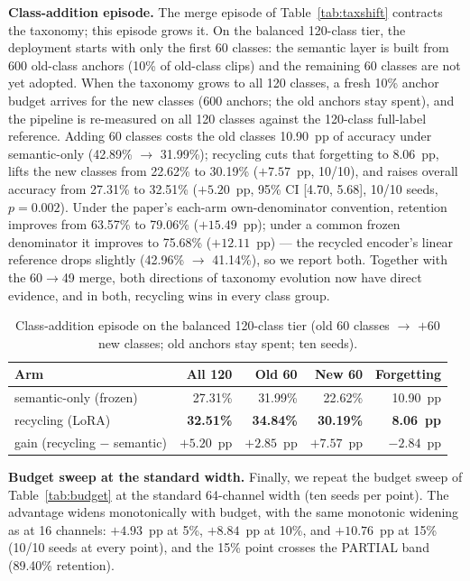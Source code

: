 \documentclass[preprint,12pt,number]{elsarticle}
\begin{document}
\textbf{Class-addition episode.} The merge episode of Table~\ref{tab:taxshift}
contracts the taxonomy; this episode grows it. On the balanced 120-class
tier, the deployment starts with only the first 60 classes: the semantic
layer is built from 600 old-class anchors (10\% of old-class clips) and the
remaining 60 classes are not yet adopted. When the taxonomy grows to all 120
classes, a fresh 10\% anchor budget arrives for the new classes (600 anchors;
the old anchors stay spent), and the pipeline is re-measured on all 120
classes against the 120-class full-label reference. Adding 60 classes costs
the old classes 10.90~pp of accuracy under semantic-only (42.89\%
$\rightarrow$ 31.99\%); recycling cuts that forgetting to 8.06~pp, lifts the
new classes from 22.62\% to 30.19\% ($+7.57$~pp, 10/10), and raises overall
accuracy from 27.31\% to 32.51\% ($+5.20$~pp, 95\% CI [4.70, 5.68], 10/10
seeds, $p=0.002$). Under the paper's each-arm own-denominator convention,
retention improves from 63.57\% to 79.06\% ($+15.49$~pp); under a common
frozen denominator it improves to 75.68\% ($+12.11$~pp) --- the recycled
encoder's linear reference drops slightly (42.96\% $\rightarrow$ 41.14\%),
so we report both. Together with the 60$\rightarrow$49 merge, both
directions of taxonomy evolution now have direct evidence, and in both,
recycling wins in every class group.

\begin{table}[H]
\centering
\caption{Class-addition episode on the balanced 120-class tier (old 60
classes $\rightarrow$ $+60$ new classes; old anchors stay spent; ten seeds).}
\label{tab:addition}
\small
\begin{tabular}{@{}lrrrr@{}}
\toprule
Arm & All 120 & Old 60 & New 60 & Forgetting \\
\midrule
semantic-only (frozen) & 27.31\% & 31.99\% & 22.62\% & 10.90~pp \\
recycling (LoRA) & \textbf{32.51\%} & \textbf{34.84\%} & \textbf{30.19\%} & \textbf{8.06~pp} \\
gain (recycling $-$ semantic) & $+5.20$~pp & $+2.85$~pp & $+7.57$~pp & $-2.84$~pp \\
\bottomrule
\end{tabular}
\end{table}

\textbf{Budget sweep at the standard width.} Finally, we repeat the budget
sweep of Table~\ref{tab:budget} at the standard 64-channel width (ten seeds
per point). The advantage widens monotonically with budget, with the same monotonic
widening as at 16 channels: $+4.93$~pp at 5\%, $+8.84$~pp at 10\%, and
$+10.76$~pp at 15\% (10/10 seeds at every point), and the 15\% point
crosses the PARTIAL band (89.40\% retention).
\end{document}
